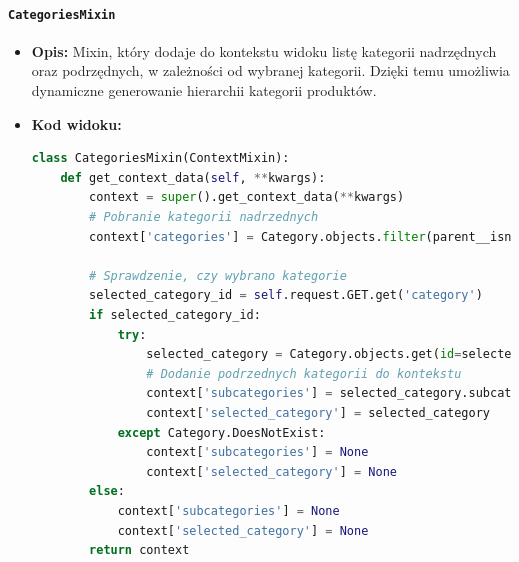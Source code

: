 \documentclass[12pt,a4paper,oneside]{article}
\theoremstyle{definition}
\numberwithin{equation}{section}
\begin{document}
\paragraph{\texttt{CategoriesMixin}}
\begin{itemize}
    \item \textbf{Opis:} Mixin, który dodaje do kontekstu widoku listę kategorii nadrzędnych oraz podrzędnych, w zależności od wybranej kategorii. Dzięki temu umożliwia dynamiczne generowanie hierarchii kategorii produktów.

    \item \textbf{Kod widoku:}
    \begin{lstlisting}[language=Python, caption=\texttt{CategoriesMixin}]
class CategoriesMixin(ContextMixin):
    def get_context_data(self, **kwargs):
        context = super().get_context_data(**kwargs)
        # Pobranie kategorii nadrzednych
        context['categories'] = Category.objects.filter(parent__isnull=True)

        # Sprawdzenie, czy wybrano kategorie
        selected_category_id = self.request.GET.get('category')
        if selected_category_id:
            try:
                selected_category = Category.objects.get(id=selected_category_id)
                # Dodanie podrzednych kategorii do kontekstu
                context['subcategories'] = selected_category.subcategories.all()
                context['selected_category'] = selected_category
            except Category.DoesNotExist:
                context['subcategories'] = None
                context['selected_category'] = None
        else:
            context['subcategories'] = None
            context['selected_category'] = None
        return context
    \end{lstlisting}


\end{itemize}
\end{document}
